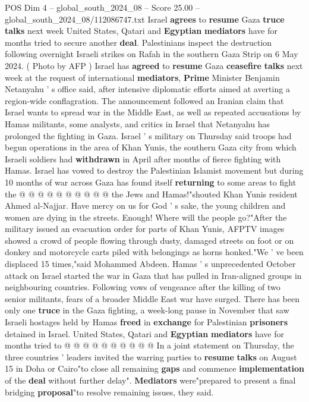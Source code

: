 \begin{textsample}{POS Dim 4 – global\_south\_2024\_08 – Score 25.00 – global\_south\_2024\_08/112086747.txt}  \label{ex:f4_pos_121}
Israel \textbf{agrees} to \textbf{resume} Gaza \textbf{truce} \textbf{talks} next week United States, Qatari and \textbf{Egyptian} \textbf{mediators} have for months tried to secure another \textbf{deal}.
Palestinians inspect the destruction following overnight Israeli strikes on Rafah in the southern Gaza Strip on 6 May 2024. ( Photo by AFP ) Israel has \textbf{agreed} to \textbf{resume} Gaza \textbf{ceasefire} \textbf{talks} next week at the request of international \textbf{mediators}, \textbf{Prime} Minister Benjamin Netanyahu ' s office said, after intensive diplomatic efforts aimed at averting a region-wide conflagration.
The announcement followed an Iranian claim that Israel wants to spread war in the Middle East, as well as repeated accusations by Hamas militants, some analysts, and critics in Israel that Netanyahu has prolonged the fighting in Gaza.
Israel ' s military on Thursday said troops had begun operations in the area of Khan Yunis, the southern Gaza city from which Israeli soldiers had \textbf{withdrawn} in April after months of fierce fighting with Hamas.
Israel has vowed to destroy the Palestinian Islamist movement but during 10 months of war across Gaza has found itself \textbf{returning} to some areas to fight the @ @ @ @ @ @ @ @ @ @ the Jews and Hamas!"shouted Khan Yunis resident Ahmed al-Najjar.
Have mercy on us for God ' s sake, the young children and women are dying in the streets.
Enough!
Where will the people go?"After the military issued an evacuation order for parts of Khan Yunis, AFPTV images showed a crowd of people flowing through dusty, damaged streets on foot or on donkey and motorcycle carts piled with belongings as horns honked."We ' ve been displaced 15 times,"said Mohammed Abdeen.
Hamas ' s unprecedented October attack on Israel started the war in Gaza that has pulled in Iran-aligned groups in neighbouring countries.
Following vows of vengeance after the killing of two senior militants, fears of a broader Middle East war have surged.
There has been only one \textbf{truce} in the Gaza fighting, a week-long pause in November that saw Israeli hostages held by Hamas \textbf{freed} in \textbf{exchange} for Palestinian \textbf{prisoners} detained in Israel.
United States, Qatari and \textbf{Egyptian} \textbf{mediators} have for months tried to @ @ @ @ @ @ @ @ @ @ In a joint statement on Thursday, the three countries ' leaders invited the warring parties to \textbf{resume} \textbf{talks} on August 15 in Doha or Cairo"to close all remaining \textbf{gaps} and commence \textbf{implementation} of the \textbf{deal} without further delay". \textbf{Mediators} were"prepared to present a final bridging \textbf{proposal}"to resolve remaining issues, they said.

\end{textsample}
